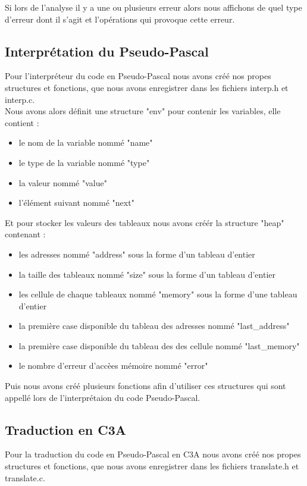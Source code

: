 \documentclass{report}
\begin{document}
Si lors de l'analyse il y a une ou plusieurs erreur alors nous affichons de quel type d'erreur dont il s'agit et l'opérations qui provoque cette erreur.

\subsection{Interprétation du Pseudo-Pascal}
Pour l'interpréteur du code en Pseudo-Pascal nous avons créé nos propes structures et fonctions, que nous avons enregistrer dans les fichiers interp.h et interp.c.\\

Nous avons alors définit une structure "env" pour contenir les variables, elle contient :
\begin{itemize}
\item le nom de la variable nommé "name"
\item le type de la variable nommé "type"
\item la valeur nommé "value"
\item l'élément suivant nommé "next"
\end{itemize}
\bigskip

Et pour stocker les valeurs des tableaux nous avons créér la structure "heap" contenant :
\begin{itemize}
\item les adresses nommé "address" sous la forme d'un tableau d'entier
\item la taille des tableaux nommé "size" sous la forme d'un tableau d'entier
\item les cellule de chaque tableaux nommé "memory" sous la forme d'une tableau d'entier
\item la première case disponible du tableau des adresses nommé "last\_address"
\item la première case disponible du tableau des des cellule nommé "last\_memory"
\item le nombre d'erreur d'accèes mémoire nommé "error"
\end{itemize}
\bigskip

Puis nous avons créé plusieurs fonctions afin d'utiliser ces structures qui sont appellé lors de l'interprétaion du code Pseudo-Pascal.

\subsection{Traduction en C3A}
Pour la traduction du code en Pseudo-Pascal en C3A nous avons créé nos propes structures et fonctions, que nous avons enregistrer dans les fichiers translate.h et translate.c.\\
\end{document}
